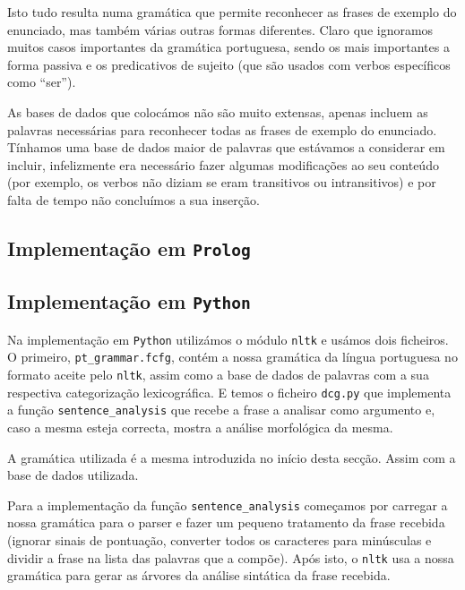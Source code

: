 \documentclass[12pt,a4paper,oneside]{article}
\begin{document}
Isto tudo resulta numa gramática que permite reconhecer as frases de
exemplo do enunciado, mas também várias outras formas
diferentes. Claro que ignoramos muitos casos importantes da gramática
portuguesa, sendo os mais importantes a forma passiva e os
predicativos de sujeito (que são usados com verbos específicos como
``ser'').

As bases de dados que colocámos não são muito extensas, apenas incluem
as palavras necessárias para reconhecer todas as frases de exemplo do
enunciado. Tínhamos uma base de dados maior de palavras que estávamos
a considerar em incluir, infelizmente era necessário fazer algumas
modificações ao seu conteúdo (por exemplo, os verbos não diziam se
eram transitivos ou intransitivos) \cite{label:2003} e por falta de
tempo não concluímos a sua inserção.

\subsection{Implementação em \texttt{Prolog}}

\lipsum[1]

\lipsum[2]

\lipsum[3]

\subsection{Implementação em \texttt{Python}}

Na implementação em \texttt{Python} utilizámos o módulo \texttt{nltk} e
usámos dois ficheiros. O primeiro, \texttt{pt\_grammar.fcfg}, contém a nossa
gramática da língua portuguesa no formato aceite pelo \texttt{nltk}, assim como
a base de dados de palavras com a sua respectiva categorização lexicográfica.
E temos o ficheiro \texttt{dcg.py} que implementa a função \texttt{sentence\_analysis}
que recebe a frase a analisar como argumento e, caso a mesma esteja correcta, mostra
a análise morfológica da mesma.

A gramática utilizada é a mesma introduzida no início desta secção. Assim com a base
de dados utilizada.

Para a implementação da função \texttt{sentence\_analysis} começamos por carregar a
nossa gramática para o parser e fazer um pequeno tratamento da frase recebida (ignorar
sinais de pontuação, converter todos os caracteres para minúsculas e dividir a frase
na lista das palavras que a compõe). Após isto, o \texttt{nltk} usa a nossa gramática
para gerar as árvores da análise sintática da frase recebida.
\end{document}
